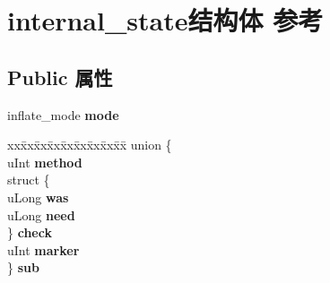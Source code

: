 \hypertarget{structinternal__state}{}\section{internal\+\_\+state结构体 参考}
\label{structinternal__state}
\subsection*{Public 属性}
\begin{DoxyCompactItemize}
\item 
\mbox{\label{structinternal__state_ac9ea84c48c0df8c7b6ceb51aa38e6c72}} 
inflate\+\_\+mode {\bfseries mode}
\item 
\mbox{\label{structinternal__state_aa2c308eec2dd1279a2f49a65803834a9}} 
\begin{tabbing}
xx\=xx\=xx\=xx\=xx\=xx\=xx\=xx\=xx\=\kill
union \{\\
\>uInt {\bfseries method}\\
\>struct \{\\
\>\>uLong {\bfseries was}\\
\>\>uLong {\bfseries need}\\
\>\} {\bfseries check}\\
\>uInt {\bfseries marker}\\
\} {\bfseries sub}\\


\end{tabbing}
\end{DoxyCompactItemize}
